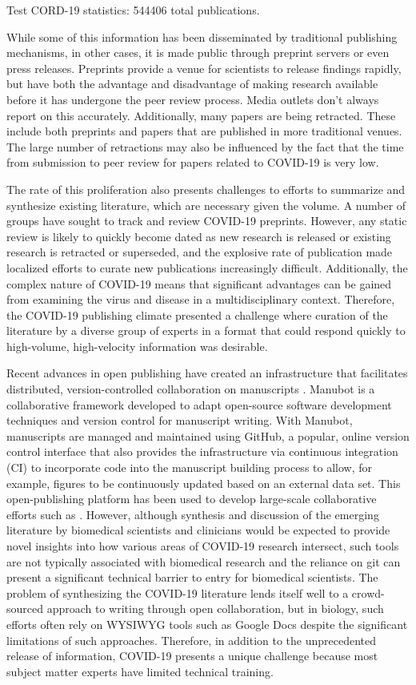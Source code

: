 \documentclass[sigconf]{acmart}
\begin{document}
Test CORD-19 statistics: 544406 total publications.

While some of this information has been disseminated by traditional publishing mechanisms, in other cases, it is made public through preprint servers or even press releases.
Preprints provide a venue for scientists to release findings rapidly, but have both the advantage and disadvantage of making research available before it has undergone the peer review process.
Media outlets don't always report on this accurately.
Additionally, many papers are being retracted.
These include both preprints and papers that are published in more traditional venues.
The large number of retractions may also be influenced by the fact that the time from submission to peer review for papers related to COVID-19 is very low.

The rate of this proliferation also presents challenges to efforts to summarize and synthesize existing literature, which are necessary given the volume.
A number of groups have sought to track and review COVID-19 preprints.
However, any static review is likely to quickly become dated as new research is released or existing research is retracted or superseded, and the explosive rate of publication made localized efforts to curate new publications increasingly difficult.
Additionally, the complex nature of COVID-19 means that significant advantages can be gained from examining the virus and disease in a multidisciplinary context.
Therefore, the COVID-19 publishing climate presented a challenge where curation of the literature by a diverse group of experts in a format that could respond quickly to high-volume, high-velocity information was desirable.

Recent advances in open publishing have created an infrastructure that facilitates distributed, version-controlled collaboration on manuscripts \citep{YuJbg3zO}.
Manubot \citep{YuJbg3zO} is a collaborative framework developed to adapt open-source software development techniques and version control for manuscript writing.
With Manubot, manuscripts are managed and maintained using GitHub, a popular, online version control interface that also provides the infrastructure via continuous integration (CI) to incorporate code into the manuscript building process to allow, for example, figures to be continuously updated based on an external data set.
This open-publishing platform has been used to develop large-scale collaborative efforts such as .
However, although synthesis and discussion of the emerging literature by biomedical scientists and clinicians would be expected to provide novel insights into how various areas of COVID-19 research intersect, such tools are not typically associated with biomedical research and the reliance on git can present a significant technical barrier to entry for biomedical scientists.
The problem of synthesizing the COVID-19 literature lends itself well to a crowd-sourced approach to writing through open collaboration, but in biology, such efforts often rely on WYSIWYG tools such as Google Docs despite the significant limitations of such approaches.
Therefore, in addition to the unprecedented release of information, COVID-19 presents a unique challenge because most subject matter experts have limited technical training.
\end{document}
